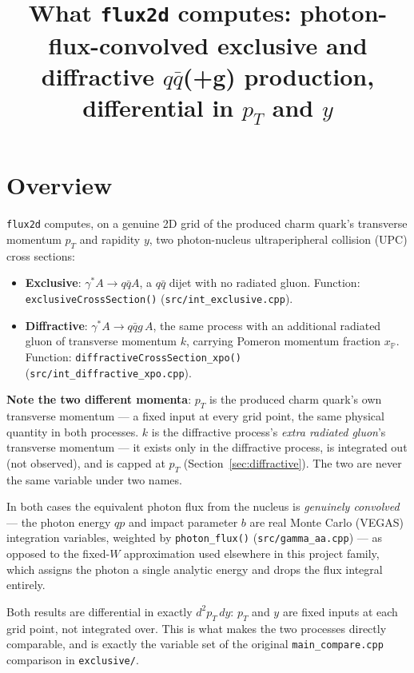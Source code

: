 \documentclass[11pt]{article}
\title{What \texttt{flux2d} computes: photon-flux-convolved exclusive and\\
diffractive $q\bar q$(+g) production, differential in $p_T$ and $y$}
\author{}
\date{}
\begin{document}
\maketitle

\section{Overview}

\texttt{flux2d} computes, on a genuine 2D grid of the produced charm
quark's transverse momentum $p_T$ and rapidity $y$, two photon-nucleus
ultraperipheral collision (UPC) cross sections:

\begin{itemize}
\item \textbf{Exclusive}: $\gamma^*A\to q\bar qA$, a $q\bar q$ dijet with
no radiated gluon. Function: \texttt{exclusiveCrossSection()}
(\texttt{src/int\_exclusive.cpp}).
\item \textbf{Diffractive}: $\gamma^*A\to q\bar q g\,A$, the same process
with an additional radiated gluon of transverse momentum $k$, carrying
Pomeron momentum fraction $x_{\mathbb P}$. Function:
\texttt{diffractiveCrossSection\_xpo()}
(\texttt{src/int\_diffractive\_xpo.cpp}).
\end{itemize}

\textbf{Note the two different momenta}: $p_T$ is the produced charm
quark's own transverse momentum — a fixed input at every grid point, the
same physical quantity in both processes. $k$ is the diffractive process's
\emph{extra radiated gluon}'s transverse momentum — it exists only in the
diffractive process, is integrated out (not observed), and is capped at
$p_T$ (Section~\ref{sec:diffractive}). The two are never the same variable
under two names.

In both cases the equivalent photon flux from the nucleus is
\emph{genuinely convolved} — the photon energy $qp$ and impact parameter
$b$ are real Monte Carlo (VEGAS) integration variables, weighted by
\texttt{photon\_flux()} (\texttt{src/gamma\_aa.cpp}) — as opposed to the
fixed-$W$ approximation used elsewhere in this project family, which
assigns the photon a single analytic energy and drops the flux integral
entirely.

Both results are differential in exactly $d^2p_T\,dy$: $p_T$ and $y$ are
fixed inputs at each grid point, not integrated over. This is what makes
the two processes directly comparable, and is exactly the variable set of
the original \texttt{main\_compare.cpp} comparison in \texttt{exclusive/}.
\end{document}

